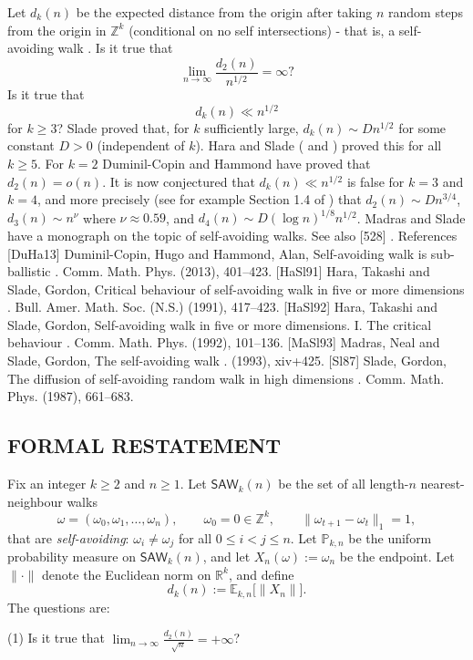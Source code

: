 Let $d_k(n)$ be the expected distance from the origin after taking $n$ random steps from the origin in $\mathbb{Z}^k$ (conditional on no self intersections) - that is, a self-avoiding walk . Is it true that\[\lim_{n\to \infty}\frac{d_2(n)}{n^{1/2}}= \infty?\]Is it true that\[d_k(n)\ll n^{1/2}\]for $k\geq 3$? Slade \cite{Sl87} proved that, for $k$ sufficiently large, $d_k(n)\sim Dn^{1/2}$ for some constant $D>0$ (independent of $k$). Hara and Slade (\cite{HaSl91} and \cite{HaSl92}) proved this for all $k\geq 5$. For $k=2$ Duminil-Copin and Hammond \cite{DuHa13} have proved that $d_2(n)=o(n)$. It is now conjectured that $d_k(n)\ll n^{1/2}$ is false for $k=3$ and $k=4$, and more precisely (see for example Section 1.4 of \cite{MaSl93}) that $d_2(n)\sim Dn^{3/4}$, $d_3(n)\sim n^{\nu}$ where $\nu\approx 0.59$, and $d_4(n)\sim D(\log n)^{1/8}n^{1/2}$. Madras and Slade \cite{MaSl93} have a monograph on the topic of self-avoiding walks. See also [528] . References [DuHa13] Duminil-Copin, Hugo and Hammond, Alan, Self-avoiding walk is sub-ballistic . Comm. Math. Phys. (2013), 401--423. [HaSl91] Hara, Takashi and Slade, Gordon, Critical behaviour of self-avoiding walk in five or more dimensions . Bull. Amer. Math. Soc. (N.S.) (1991), 417--423. [HaSl92] Hara, Takashi and Slade, Gordon, Self-avoiding walk in five or more dimensions. {I}. {T}he critical behaviour . Comm. Math. Phys. (1992), 101--136. [MaSl93] Madras, Neal and Slade, Gordon, The self-avoiding walk . (1993), xiv+425. [Sl87] Slade, Gordon, The diffusion of self-avoiding random walk in high dimensions . Comm. Math. Phys. (1987), 661--683.


\subsection*{FORMAL RESTATEMENT}
Fix an integer $k\ge 2$ and $n\ge 1$. Let $\mathsf{SAW}_{k}(n)$ be the set of all length-$n$ nearest-neighbour walks
\[
\omega=(\omega_0,\omega_1,\dots,\omega_n),\qquad \omega_0=0\in\mathbb Z^k,\qquad \|\omega_{t+1}-\omega_t\|_1=1,
\]
that are \emph{self-avoiding}: $\omega_i\neq \omega_j$ for all $0\le i<j\le n$.
Let $\mathbb P_{k,n}$ be the uniform probability measure on $\mathsf{SAW}_{k}(n)$, and let $X_n(\omega):=\omega_n$ be the endpoint.
Let $\|\cdot\|$ denote the Euclidean norm on $\mathbb R^k$, and define
\[
d_k(n):=\mathbb E_{k,n}\big[\|X_n\|\big].
\]
The questions are:

(1) Is it true that $\displaystyle \lim_{n\to\infty}\frac{d_2(n)}{\sqrt n}=+\infty$?


